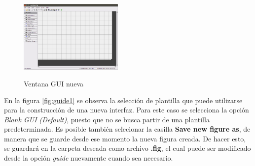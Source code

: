 \documentclass{article}
\begin{document}
\begin{multicols}{2}
\begin{figure}[H]
\centering
\includegraphics[width=0.45\textwidth]{GuidePlano.png}
\label{fig:guide2}
\caption{Ventana GUI nueva}
\end{figure}
En la figura \ref{fig:guide1} se observa la selección de plantilla que puede utilizarse para la construcción de una nueva interfaz. Para este caso se selecciona la opción \textit{Blank GUI (Default)}, puesto que no se busca partir de una plantilla predeterminada. Es posible también selecionar la casilla \textbf{Save new figure as}, de manera que se guarde desde ese momento la nueva figura creada. De hacer esto, se guardará en la carpeta deseada como archivo \textbf{.fig}, el cual puede ser modificado desde la opción \textit{guide} nuevamente cuando sea necesario.


\end{multicols}
\end{document}
